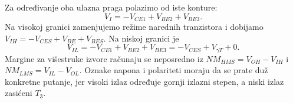 Za određivanje oba ulazna praga polazimo od iste konture:
\[V_I=-V_{CE1}+V_{BE2}+V_{BE3}.\]
Na visokoj granici zamenjujemo režime narednih tranzistora i dobijamo $V_{IH}=-V_{CES}+V_{BE}+V_{BES}$. Na niskoj granici je
\[V_{IL}=-V_{CE1}+V_{BE2}+V_{BE3}=-V_{CES}+V_{\gamma T}+0.\]
Margine za višestruke izvore računaju se neposredno iz $NM_{HMS}=V_{OH}-V_{IH}$ i $NM_{LMS}=V_{IL}-V_{OL}$. Oznake napona i polariteti moraju da se prate duž konkretne putanje, jer visoki izlaz određuje gornji izlazni stepen, a niski izlaz zasićeni $T_3$.
